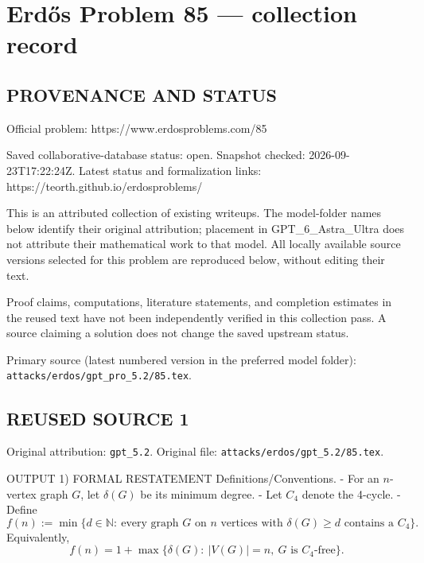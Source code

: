 \section*{Erd\H{o}s Problem 85 --- collection record}

\subsection*{PROVENANCE AND STATUS}
Official problem: https://www.erdosproblems.com/85

Saved collaborative-database status: open.
Snapshot checked: 2026-09-23T17:22:24Z.
Latest status and formalization links: https://teorth.github.io/erdosproblems/

This is an attributed collection of existing writeups. The model-folder names below identify their original attribution; placement in GPT\_6\_Astra\_Ultra does not attribute their mathematical work to that model. All locally available source versions selected for this problem are reproduced below, without editing their text.

Proof claims, computations, literature statements, and completion estimates in the reused text have not been independently verified in this collection pass. A source claiming a solution does not change the saved upstream status.

Primary source (latest numbered version in the preferred model folder): \texttt{attacks/erdos/gpt\_pro\_5.2/85.tex}.

\subsection*{REUSED SOURCE 1}
Original attribution: \texttt{gpt\_5.2}.
Original file: \texttt{attacks/erdos/gpt\_5.2/85.tex}.


OUTPUT
1) FORMAL RESTATEMENT
Definitions/Conventions.
- For an $n$-vertex graph $G$, let $\delta(G)$ be its minimum degree.
- Let $C_4$ denote the 4-cycle.
- Define
\[f(n):=\min\{d\in\mathbb N:\ \text{every graph }G\text{ on }n\text{ vertices with }\delta(G)\ge d \text{ contains a }C_4\}.\]
Equivalently,
\[f(n)=1+\max\{\delta(G):\ |V(G)|=n,\ G\text{ is }C_4\text{-free}\}.\]

